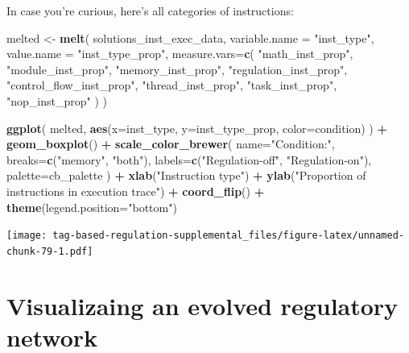 \documentclass[]{book}
\newenvironment{Shaded}{\begin{snugshade}}{\end{snugshade}}
\newcommand{\DataTypeTok}[1]{\textcolor[rgb]{0.13,0.29,0.53}{#1}}
\newcommand{\KeywordTok}[1]{\textcolor[rgb]{0.13,0.29,0.53}{\textbf{#1}}}
\newcommand{\NormalTok}[1]{#1}
\newcommand{\OperatorTok}[1]{\textcolor[rgb]{0.81,0.36,0.00}{\textbf{#1}}}
\newcommand{\StringTok}[1]{\textcolor[rgb]{0.31,0.60,0.02}{#1}}
\begin{document}
In case you're curious, here's all categories of instructions:

\begin{Shaded}
\begin{Highlighting}[]
\NormalTok{melted <-}\StringTok{ }\KeywordTok{melt}\NormalTok{(}
\NormalTok{  solutions_inst_exec_data,}
  \DataTypeTok{variable.name =} \StringTok{"inst_type"}\NormalTok{,}
  \DataTypeTok{value.name =} \StringTok{"inst_type_prop"}\NormalTok{,}
  \DataTypeTok{measure.vars=}\KeywordTok{c}\NormalTok{(}
    \StringTok{"math_inst_prop"}\NormalTok{,}
    \StringTok{"module_inst_prop"}\NormalTok{,}
    \StringTok{"memory_inst_prop"}\NormalTok{,}
    \StringTok{"regulation_inst_prop"}\NormalTok{,}
    \StringTok{"control_flow_inst_prop"}\NormalTok{,}
    \StringTok{"thread_inst_prop"}\NormalTok{,}
    \StringTok{"task_inst_prop"}\NormalTok{,}
    \StringTok{"nop_inst_prop"}
\NormalTok{  )}
\NormalTok{)}

\KeywordTok{ggplot}\NormalTok{( melted, }\KeywordTok{aes}\NormalTok{(}\DataTypeTok{x=}\NormalTok{inst_type, }\DataTypeTok{y=}\NormalTok{inst_type_prop, }\DataTypeTok{color=}\NormalTok{condition) ) }\OperatorTok{+}
\StringTok{  }\KeywordTok{geom_boxplot}\NormalTok{() }\OperatorTok{+}
\StringTok{  }\KeywordTok{scale_color_brewer}\NormalTok{(}
    \DataTypeTok{name=}\StringTok{"Condition:"}\NormalTok{,}
    \DataTypeTok{breaks=}\KeywordTok{c}\NormalTok{(}\StringTok{"memory"}\NormalTok{, }\StringTok{"both"}\NormalTok{),}
    \DataTypeTok{labels=}\KeywordTok{c}\NormalTok{(}\StringTok{"Regulation-off"}\NormalTok{, }\StringTok{"Regulation-on"}\NormalTok{),}
    \DataTypeTok{palette=}\NormalTok{cb_palette}
\NormalTok{  ) }\OperatorTok{+}
\StringTok{  }\KeywordTok{xlab}\NormalTok{(}\StringTok{"Instruction type"}\NormalTok{) }\OperatorTok{+}
\StringTok{  }\KeywordTok{ylab}\NormalTok{(}\StringTok{"Proportion of instructions in execution trace"}\NormalTok{) }\OperatorTok{+}
\StringTok{  }\KeywordTok{coord_flip}\NormalTok{() }\OperatorTok{+}
\StringTok{  }\KeywordTok{theme}\NormalTok{(}\DataTypeTok{legend.position=}\StringTok{"bottom"}\NormalTok{)}
\end{Highlighting}
\end{Shaded}

\texttt{[image: tag-based-regulation-supplemental\_files/figure-latex/unnamed-chunk-79-1.pdf]}

\hypertarget{visualizaing-an-evolved-regulatory-network}{%
\section{Visualizaing an evolved regulatory network}\label{visualizaing-an-evolved-regulatory-network}}
\end{document}
